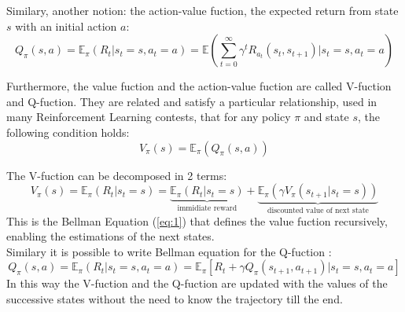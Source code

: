 \documentclass[14pt]{extarticle}
\def\ppn{\vspace{10pt}}
\begin{document}
\begin{flushleft}
Similary, another notion: the action-value fuction, the expected return from state $s$ with an initial action $a$:
\[Q_{\pi}(s,a) = \mathbb{E}_{\pi}(R_t|s_t=s, a_t=a) = \mathbb{E}(\sum_{t=0}^{\infty} \gamma^t R_{a_t}(s_t, s_{t+1})|s_t=s,a_t=a)\]

Furthermore, the value fuction and the action-value fuction are called V-fuction and Q-fuction. They are related and satisfy a particular relationship, used in many Reinforcement Learning contests, that for any policy $\pi$ and state $s$, the following condition holds:
\[V_{\pi}(s) = \mathbb{E}_{\pi}(Q_{\pi}(s,a))\]

\ppn
The V-fuction can be decomposed in 2 terms:
\begin{equation} \label{eq:1}
V_{\pi}(s) = \mathbb{E}_{\pi}(R_t|s_t=s) = 
					\underbrace{\mathbb{E}_{\pi}(R_{t}|s_t=s)}_{\text{immidiate reward}} + 
					\underbrace{\mathbb{E}_{\pi}(\gamma V_{\pi}(s_{t+1}|s_t=s))}_{\text{discounted value of next state}}
\end{equation}
This is the Bellman Equation (\ref{eq:1}) that defines the value fuction recursively, enabling the estimations of the next states. \\
Similary it is possible to write Bellman equation for the Q-fuction :
\[Q_{\pi}(s,a) = \mathbb{E}_{\pi}(R_t|s_t=s, a_t=a) = \mathbb{E}_{\pi}[R_t + \gamma Q_{\pi}(s_{t+1},a_{t+1})| s_t=s, a_t=a] \]
In this way the V-fuction and the  Q-fuction are updated with the values of the successive states without the need to know the trajectory till the end.


\end{flushleft}
\end{document}
